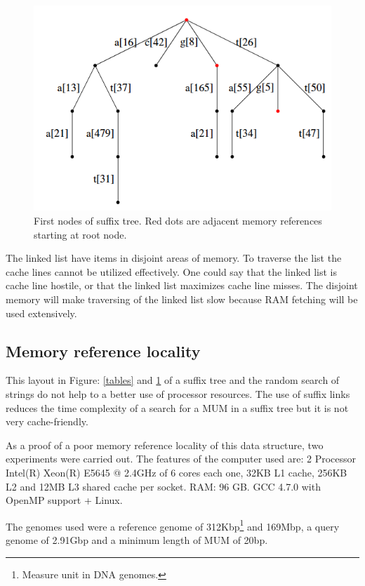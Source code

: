 \documentclass[conference]{IEEEtran}
\begin{document}
\begin{figure}[hbtp]
\centering
\includegraphics[scale=0.4]{st-locality.png}
\caption{First nodes of suffix tree. Red dots are adjacent memory references starting at root node.}
\label{stlocality}
\end{figure}

 The linked list have items in disjoint areas of memory. To traverse the list the cache lines cannot be utilized effectively. One could say that the linked list is cache line hostile, or that the linked list maximizes cache line misses. The disjoint memory will make traversing of the linked list slow because RAM fetching will be used extensively.

\subsection{Memory reference locality}
\label{locality}
This layout in Figure: \ref{tables} and \ref{stlocality} of a suffix tree and the random search of strings do not help to a better use of processor resources. The use of suffix links reduces the time complexity of a search for a MUM in a suffix tree but it is not very cache-friendly.

As a proof of a poor memory reference locality of this data structure, two experiments were carried out. The features of the computer used are: 2 Processor Intel(R) Xeon(R) E5645 @ 2.4GHz of 6 cores each one, 32KB L1 cache, 256KB L2 and 12MB L3 shared cache per socket. RAM: 96 GB. GCC 4.7.0 with OpenMP support + Linux.

The genomes used were a reference genome of 312Kbp\footnote{Measure unit in DNA genomes.} and 169Mbp, a query genome of 2.91Gbp and a minimum length of MUM of 20bp.
\end{document}
